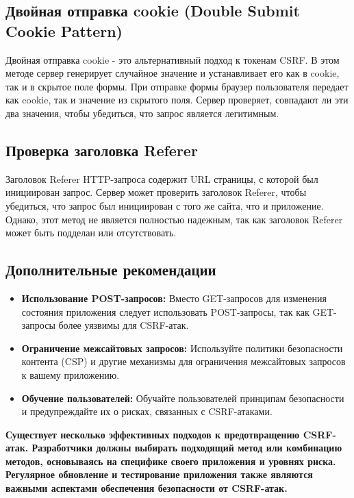 \documentclass[a4paper,12pt]{diplom}
\begin{document}
	 \subsection{Двойная отправка cookie (Double Submit Cookie Pattern)}
	 
	 Двойная отправка cookie - это альтернативный подход к токенам CSRF.  В этом методе сервер генерирует случайное значение и устанавливает его как в cookie, так и в скрытое поле формы.  При отправке формы браузер пользователя передает как cookie, так и значение из скрытого поля.  Сервер проверяет, совпадают ли эти два значения, чтобы убедиться, что запрос является легитимным. 
	 
	 \subsection{Проверка заголовка Referer}
	 
	 Заголовок Referer HTTP-запроса содержит URL страницы, с которой был инициирован запрос.  Сервер может проверить заголовок Referer, чтобы убедиться, что запрос был инициирован с того же сайта, что и приложение.  Однако, этот метод не является полностью надежным, так как заголовок Referer может быть подделан или отсутствовать.
	 
	 \subsection{Дополнительные рекомендации}
	 
	 \begin{itemize}
	 	\item \textbf{Использование POST-запросов:}  Вместо GET-запросов для изменения состояния приложения следует использовать POST-запросы, так как GET-запросы более уязвимы для CSRF-атак.
	 	\item \textbf{Ограничение межсайтовых запросов:}  Используйте политики безопасности контента (CSP) и другие механизмы для ограничения межсайтовых запросов к вашему приложению.
	 	\item \textbf{Обучение пользователей:}  Обучайте пользователей принципам безопасности и предупреждайте их о рисках, связанных с CSRF-атаками.
	 	
	 \end{itemize}
	 
	 \textbf{Существует несколько эффективных подходов к предотвращению CSRF-атак.  Разработчики должны выбирать подходящий метод или комбинацию методов, основываясь на специфике своего приложения и уровнях риска.  Регулярное обновление и тестирование приложения также являются важными аспектами обеспечения безопасности от CSRF-атак.}
	 
\end{document}
